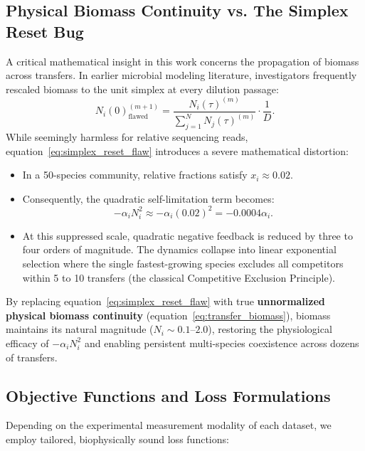 \subsection{Physical Biomass Continuity vs. The Simplex Reset Bug}
A critical mathematical insight in this work concerns the propagation of biomass across transfers. In earlier microbial modeling literature, investigators frequently rescaled biomass to the unit simplex at every dilution passage:
\begin{equation}
    \label{eq:simplex_reset_flaw}
    N_i(0)^{(m+1)}_{\text{flawed}} = \frac{N_i(\tau)^{(m)}}{\sum_{j=1}^N N_j(\tau)^{(m)}} \cdot \frac{1}{D}.
\end{equation}
While seemingly harmless for relative sequencing reads, equation~\eqref{eq:simplex_reset_flaw} introduces a severe mathematical distortion:
\begin{itemize}
    \item In a 50-species community, relative fractions satisfy $x_i \approx 0.02$.
    \item Consequently, the quadratic self-limitation term becomes:
    \begin{equation}
        -\alpha_i N_i^2 \approx -\alpha_i (0.02)^2 = -0.0004 \alpha_i.
    \end{equation}
    \item At this suppressed scale, quadratic negative feedback is reduced by three to four orders of magnitude. The dynamics collapse into linear exponential selection where the single fastest-growing species excludes all competitors within 5 to 10 transfers (the classical Competitive Exclusion Principle).
\end{itemize}
By replacing equation~\eqref{eq:simplex_reset_flaw} with true \textbf{unnormalized physical biomass continuity} (equation~\eqref{eq:transfer_biomass}), biomass maintains its natural magnitude ($N_i \sim 0.1\text{--}2.0$), restoring the physiological efficacy of $-\alpha_i N_i^2$ and enabling persistent multi-species coexistence across dozens of transfers.

\subsection{Objective Functions and Loss Formulations}
Depending on the experimental measurement modality of each dataset, we employ tailored, biophysically sound loss functions:

